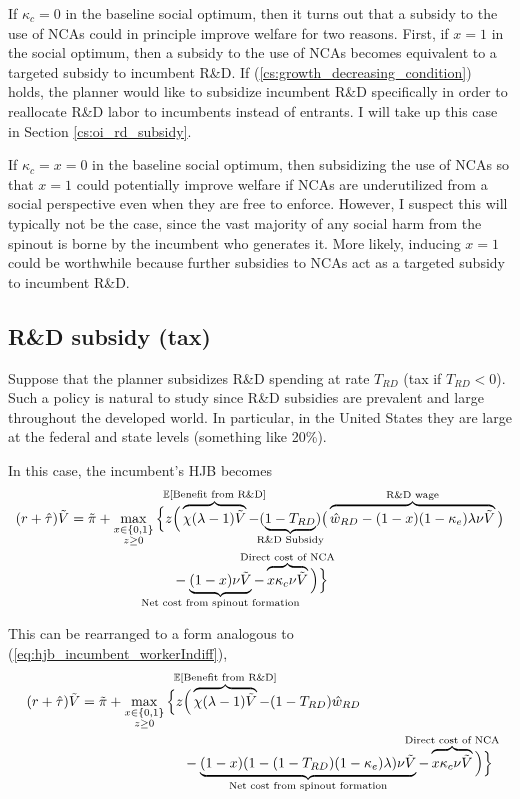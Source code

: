 \documentclass[11pt,english]{article}
\begin{document}
If $\kappa_c = 0$ in the baseline social optimum, then it turns out that a subsidy to the use of NCAs could in principle improve welfare for two reasons. First, if $x = 1$ in the social optimum, then a subsidy to the use of NCAs becomes equivalent to a targeted subsidy to incumbent R\&D. If (\ref{cs:growth_decreasing_condition}) holds, the planner would like to subsidize incumbent R\&D specifically in order to reallocate R\&D labor to incumbents instead of entrants. I will take up this case in Section \ref{cs:oi_rd_subsidy}.

If $\kappa_c = x = 0$ in the baseline social optimum, then subsidizing the use of NCAs so that $x = 1$ could potentially improve welfare if NCAs are underutilized from a social perspective even when they are free to enforce. However, I suspect this will typically not be the case, since the vast majority of any social harm from the spinout is borne by the incumbent who generates it. More likely, inducing $x = 1$ could be worthwhile because further subsidies to NCAs act as a targeted subsidy to incumbent R\&D.

\subsection{R\&D subsidy (tax)}

Suppose that the planner subsidizes R\&D spending at rate $T_{RD}$ (tax if $T_{RD} < 0$). Such a policy is natural to study since R\&D subsidies are prevalent and large throughout the developed world. In particular, in the United States they are large at the federal and state levels (something like 20\%).

In this case, the incumbent's HJB becomes
\begin{align}
	(r + \hat{\tau}) \tilde{V} = \tilde{\pi} + \max_{\substack{x \in \{0,1\} \\ z \ge 0}} \Big\{z &\Big( \overbrace{\chi (\lambda - 1) \tilde{V}}^{\mathclap{\mathbb{E}[\textrm{Benefit from R\&D}]}}- (\underbrace{1-T_{RD}}_{\mathclap{\text{R\&D Subsidy}}}) \big( \overbrace{\hat{w}_{RD} - (1-x)(1-\kappa_e)\lambda \nu \tilde{V}}^{\mathclap{\text{R\&D wage}}}\big) \label{eq:hjb_incumbent_RDsubsidy} \nonumber \\ 
	&-  \underbrace{(1-x) \nu \tilde{V}}_{\mathclap{\text{Net cost from spinout formation}}} - \overbrace{x \kappa_{c} \nu \tilde{V}}^{\mathclap{\text{Direct cost of NCA}}}\Big) \Big\} 
\end{align}

This can be rearranged to a form analogous to (\ref{eq:hjb_incumbent_workerIndiff}),
\begin{align}
	(r + \hat{\tau}) \tilde{V} = \tilde{\pi} + \max_{\substack{x \in \{0,1\} \\ z \ge 0}} \Big\{z &\Big( \overbrace{\chi (\lambda - 1) \tilde{V}}^{\mathclap{\mathbb{E}[\textrm{Benefit from R\&D}]}}- (1-T_{RD}) \hat{w}_{RD} \\
	&-  \underbrace{(1-x)(1 - (1-T_{RD})(1-\kappa_{e})\lambda)\nu \tilde{V}}_{\mathclap{\text{Net cost from spinout formation}}} - \overbrace{x \kappa_{c} \nu \tilde{V}}^{\mathclap{\text{Direct cost of NCA}}}\Big) \Big\} \label{eq:hjb_incumbent_RDsubsidy_2}
\end{align}
\end{document}
